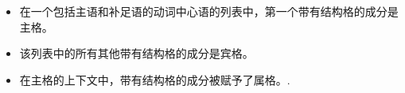 \begin{principle-break}
\label{case-p}
\begin{itemize}
\item 在一个包括主语和补足语的动词中心语的列表中，第一个带有结构格的成分是主格。
\item 该列表中的所有其他带有结构格的成分是宾格。
\item 在主格的上下文中，带有结构格的成分被赋予了属格。.
\end{itemize}
\end{principle-break}

